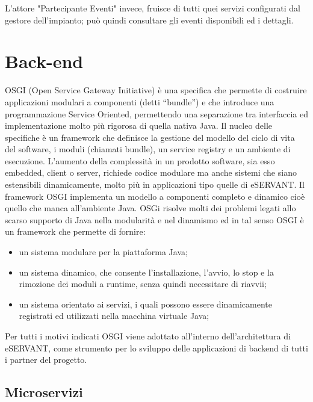 L'attore "Partecipante Eventi" invece, fruisce di tutti quei servizi configurati dal gestore dell'impianto; può quindi consultare gli eventi disponibili ed
i dettagli.

\section{Back-end}
OSGI (Open Service Gateway Initiative) è una specifica che permette di costruire
applicazioni modulari a componenti (detti “bundle”) e che introduce una
programmazione Service Oriented, permettendo una separazione tra interfaccia ed
implementazione molto più rigorosa di quella nativa Java.
Il nucleo delle specifiche è un framework che definisce la gestione del modello del ciclo di vita del software, i moduli (chiamati bundle), un service registry e un ambiente di esecuzione. 
L’aumento della complessità in un prodotto software, sia esso embedded, client o server, richiede codice modulare ma anche sistemi che siano estensibili dinamicamente, molto più in applicazioni tipo quelle di eSERVANT. Il framework OSGI implementa un modello a componenti completo e dinamico cioè quello che manca all’ambiente Java. 
OSGi risolve molti dei problemi legati allo scarso supporto di Java nella modularità e nel dinamismo ed in tal senso OSGI è un framework che permette di fornire: 
\begin{itemize}
\item un sistema modulare per la piattaforma Java;
\item un sistema dinamico, che consente l’installazione, l’avvio, lo stop e la
rimozione dei moduli a runtime, senza quindi necessitare di riavvii;
\item un sistema orientato ai servizi, i quali possono essere dinamicamente
registrati ed utilizzati nella macchina virtuale Java;
\end{itemize}




Per tutti i motivi indicati OSGI viene adottato all’interno dell’architettura di eSERVANT,
come strumento per lo sviluppo delle applicazioni di backend di tutti i partner del
progetto.

\subsection{Microservizi}

